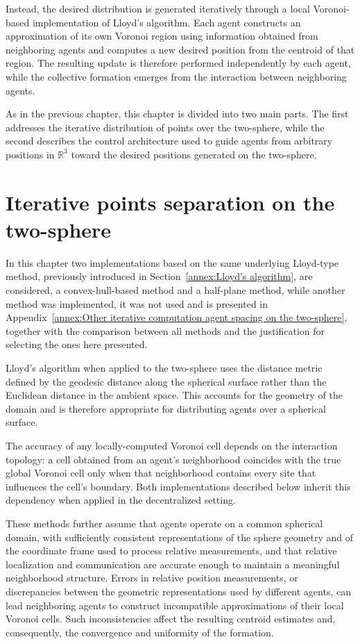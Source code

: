 Instead, the desired distribution is generated iteratively through a local Voronoi-based implementation of Lloyd's algorithm. Each agent constructs an approximation of its own Voronoi region using information obtained from neighboring agents and computes a new desired position from the centroid of that region. The resulting update is therefore performed independently by each agent, while the collective formation emerges from the interaction between neighboring agents.

As in the previous chapter, this chapter is divided into two main parts. The first addresses the iterative distribution of points over the two-sphere, while the second describes the control architecture used to guide agents from arbitrary positions in $\mathbb{R}^3$ toward the desired positions generated on the two-sphere.


\section{Iterative points separation on the two-sphere} \label{sec.5:Iterative computation agent spacing on the two-sphere}

In this chapter two implementations based on the same underlying Lloyd-type method, previously introduced in Section~\ref{annex:Lloyd's algorithm}, are considered, a convex-hull-based method and a half-plane method, while another method was implemented, it was not used and is presented in Appendix~\ref{annex:Other iterative computation agent spacing on the two-sphere}, together with the comparison between all methods and the justification for selecting the ones here presented. 

Lloyd's algorithm when applied to the two-sphere uses the distance metric defined by the geodesic distance along the spherical surface rather than the Euclidean distance in the ambient space. This accounts for the geometry of the domain and is therefore appropriate for distributing agents over a spherical surface.

The accuracy of any locally-computed Voronoi cell depends on the interaction  topology: a cell obtained from an agent's neighborhood coincides with the true  global Voronoi cell only when that neighborhood contains every site that  influences the cell's boundary. Both implementations described below inherit  this dependency when applied in the decentralized setting.

These methods further assume that agents operate on a common spherical domain,  with sufficiently consistent representations of the sphere geometry and of the  coordinate frame used to process relative measurements, and that relative  localization and communication are accurate enough to maintain a meaningful  neighborhood structure. Errors in relative position measurements, or  discrepancies between the geometric representations used by different agents,  can lead neighboring agents to construct incompatible approximations of their  local Voronoi cells. Such inconsistencies affect the resulting centroid  estimates and, consequently, the convergence and uniformity of the formation.


